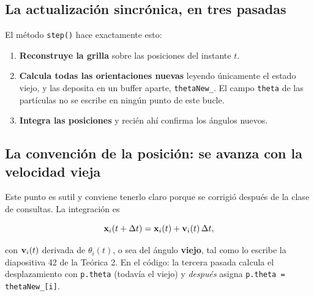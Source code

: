 \documentclass[11pt]{article}
\begin{document}

\subsection{La actualización sincrónica, en tres pasadas}

El método \texttt{step()} hace exactamente esto:

\begin{enumerate}
  \item \textbf{Reconstruye la grilla} sobre las posiciones del instante $t$.
  \item \textbf{Calcula todas las orientaciones nuevas} leyendo únicamente el
    estado viejo, y las deposita en un buffer aparte, \texttt{thetaNew\_}. El
    campo \texttt{theta} de las partículas no se escribe en ningún punto de este
    bucle.
  \item \textbf{Integra las posiciones} y recién ahí confirma los ángulos
    nuevos.
\end{enumerate}


\subsection{La convención de la posición: se avanza con la velocidad vieja}

Este punto es sutil y conviene tenerlo claro porque se corrigió después de la
clase de consultas. La integración es

\[
  \mathbf{x}_i(t+\Delta t) = \mathbf{x}_i(t) + \mathbf{v}_i(t)\,\Delta t,
\]

con $\mathbf{v}_i(t)$ derivada de $\theta_i(t)$, o sea del ángulo \textbf{viejo},
tal como lo escribe la diapositiva 42 de la Teórica 2. En el código: la tercera
pasada calcula el desplazamiento con \texttt{p.theta} (todavía el viejo) y
\emph{después} asigna \texttt{p.theta = thetaNew\_[i]}.
\end{document}
